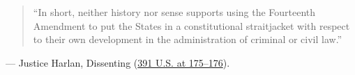 \documentclass[12pt]{article}
\begin{document}
\begin{quote}
``In short, neither history nor sense supports using the Fourteenth Amendment to put the States in a constitutional straitjacket with respect to their own development in the administration of criminal or civil law.''
\end{quote}
\noindent --- Justice Harlan, Dissenting (\href{https://supreme.justia.com/cases/federal/us/391/145/}{391 U.S. at 175--176}).
\end{document}
